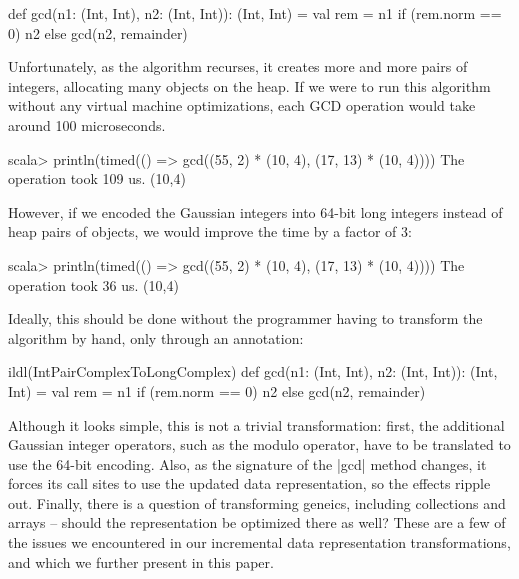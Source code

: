 \begin{lstlisting-nobreak}
def gcd(n1: (Int, Int), n2: (Int, Int)): (Int, Int) = {
  val rem = n1 %
  if (rem.norm == 0) n2 else gcd(n2, remainder)
}
\end{lstlisting-nobreak}

Unfortunately, as the algorithm recurses, it creates more and more pairs of integers, allocating many objects on the heap. If we were to run this algorithm without any virtual machine optimizations, each GCD operation would take around 100 microseconds.

\begin{lstlisting-nobreak}
scala> println(timed(() => gcd((55, 2) * (10, 4), (17, 13) * (10, 4))))
The operation took 109 us.
(10,4)
\end{lstlisting-nobreak}

However, if we encoded the Gaussian integers into 64-bit long integers instead of heap pairs of objects, we would improve the time by a factor of 3:

\begin{lstlisting-nobreak}
scala> println(timed(() => gcd((55, 2) * (10, 4), (17, 13) * (10, 4))))
The operation took 36 us.
(10,4)
\end{lstlisting-nobreak}

Ideally, this should be done without the programmer having to transform the algorithm by hand, only through an annotation:

\begin{lstlisting-nobreak}
ildl(IntPairComplexToLongComplex) {
  def gcd(n1: (Int, Int), n2: (Int, Int)): (Int, Int) = {
    val rem = n1 %
    if (rem.norm == 0) n2 else gcd(n2, remainder)
  }
}
\end{lstlisting-nobreak}

Although it looks simple, this is not a trivial transformation: first, the additional Gaussian integer operators, such as the modulo operator, have to be translated to use the 64-bit encoding. Also, as the signature of the |gcd| method changes, it forces its call sites to use the updated data representation, so the effects ripple out. Finally, there is a question of transforming geneics, including collections and arrays -- should the representation be optimized there as well? These are a few of the issues we encountered in our incremental data representation transformations, and which we further present in this paper.

